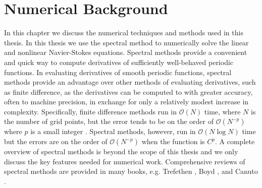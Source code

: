 \chapter{Numerical Background}

In this chapter we discuss the numerical techniques and methods used in this thesis. In this thesis we use the spectral method to numerically solve the linear and nonlinear Navier-Stokes equations. Spectral methods provide a convenient and quick way to compute derivatives of sufficiently well-behaved periodic functions. In evaluating derivatives of smooth periodic functions, spectral methods provide an advantage over other methods of evaluating derivatives, such as finite difference, as the derivatives can be computed to with greater accuracy, often to machine precision, in exchange for only a relatively modest increase in complexity. Specifically, finite difference methods run in $\mathcal{O}(N)$ time, where $N$ is the number of grid points, but the error tends to be on the order of $\mathcal{O}(N^{-p})$ where $p$ is a small integer \cite{durran}. Spectral methods, however, run in $\mathcal{O}(N\log N)$ time but the errors are on the order of $\mathcal{O}(N^{-p})$ when the function is $C^{p}$\cite{trefethen_spectral}. A complete overview of spectral methods is beyond the scope of this thesis and we only discuss the key features needed for numerical work. Comprehensive reviews of spectral methods are provided in many books, e.g. Trefethen \cite{trefethen_spectral}, Boyd \cite{boyd2001}, and Canuto \cite{canuto}.


